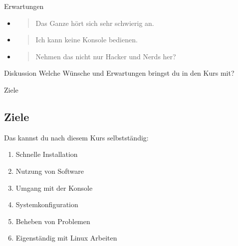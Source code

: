 \begin{frame}{Erwartungen}
    \begin{itemize}
        \item \begin{quote}\pause
            Das Ganze hört sich sehr schwierig an.
        \end{quote}\pause
        \item \begin{quote}
                  Ich kann keine Konsole bedienen.
        \end{quote}\pause
        \item \begin{quote}
                  Nehmen das nicht nur Hacker und Nerds her?
        \end{quote}
    \end{itemize}

    \pause
    \vspace{0.5cm}
    \begin{alertblock}{Diskussion}
        Welche Wünsche und Erwartungen bringst du in den Kurs mit?
    \end{alertblock}

\end{frame}

\begin{frame}{Ziele}
    \subsection{Ziele}\label{subsec:ziele}
    \pause

    Das kannst du nach diesem Kurs selbstständig:

    \pause
    \begin{enumerate}
        \item Schnelle Installation\pause
        \item Nutzung von Software\pause
        \item Umgang mit der Konsole\pause
        \item Systemkonfiguration\pause
        \item Beheben von Problemen\pause
        \item Eigenständig mit Linux Arbeiten
    \end{enumerate}

\end{frame}